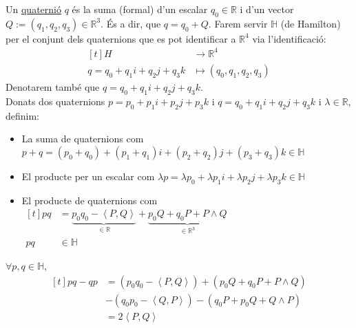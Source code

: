 \documentclass[a4paper,12pt]{article}
\begin{document}
	\begin{definicio}
		Un \underline{quaternió} $q$ és la suma (formal) d'un escalar $q_0 \in \mathbb{R}$ i d'un vector $Q := (q_1, q_2, q_3) \in \mathbb{R}^3$.
		És a dir, que $q = q_0 + Q$.
		Farem servir $\mathbb{H}$ (de Hamilton) per el conjunt dels quaternions que es pot identificar a $\mathbb{R}^4$ via l'identificació:
		\begin{displaymath}
			\begin{aligned}[t]
				H &\longrightarrow \mathbb{R}^4\\
				q=q_0+q_1i+q_2j+q_3k &\longmapsto (q_0, q_1, q_2, q_3)
			\end{aligned}
		\end{displaymath}
		Denotarem també que $q = q_0 + q_1i + q_2j + q_3k$.\\
		Donats dos quaternions $p = p_0 + p_1i + p_2j + p_3k$ i $q = q_0 + q_1i + q_2j + q_3k$ i $\lambda \in \mathbb{R}$,
		definim:
		\begin{itemize}
			\item La suma de quaternions com $p + q = (p_0 + q_0) + (p_1 + q_1)i + (p_2 + q_2)j + (p_3 + q_3)k \in \mathbb{H}$
			\item El producte per un escalar com $\lambda p = \lambda p_0 + \lambda p_1i + \lambda p_2j + \lambda p_3k \in \mathbb{H}$
			\item El producte de quaternions com $\begin{aligned}[t]pq &= \underbrace{p_0q_0-\left\langle P, Q\right\rangle}_{\in \mathbb{R}} + \underbrace{p_0Q + q_0P + P \wedge Q}_{\in \mathbb{R}^3}\\pq &\in \mathbb{H}\end{aligned}$
		\end{itemize}
	\end{definicio}

	\begin{obs}
		$\forall p,q \in \mathbb{H}$,
		\begin{displaymath}
			\begin{aligned}[t]
				pq-qp   &= \left(p_0q_0-\left\langle P, Q\right\rangle\right) + \left(p_0Q + q_0P + P \wedge Q\right)\\
						& - \left(q_0p_0-\left\langle Q, P\right\rangle\right) - \left(q_0P + p_0Q + Q \wedge P\right)\\
				    	&= 2\left\langle P, Q\right\rangle
			\end{aligned}
		\end{displaymath}
	\end{obs}
\end{document}

